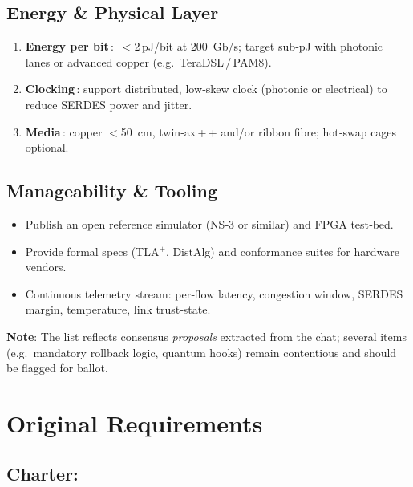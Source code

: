 \subsection{Energy \& Physical Layer}
\begin{enumerate}%
  \item \textbf{Energy per bit}\,: \,$<$2\,pJ/bit at 200 Gb/s; target sub‑pJ with photonic lanes or advanced copper (e.g.\ TeraDSL\,/\,PAM8).  
  \item \textbf{Clocking}\,: support distributed, low‑skew clock (photonic or electrical) to reduce SERDES power and jitter.  
  \item \textbf{Media}\,: copper $<$50 cm, twin‑ax\,+\,+ and/or ribbon fibre; hot‑swap cages optional.
\end{enumerate}

\subsection{Manageability \& Tooling}
\begin{itemize}
  \item Publish an open reference simulator (NS‑3 or similar) and FPGA test‑bed.  
  \item Provide formal specs (TLA$^{+}$, DistAlg) and conformance suites for hardware vendors.  
  \item Continuous telemetry stream: per‑flow latency, congestion window, SERDES margin, temperature, link trust‑state.
\end{itemize}

\bigskip
\noindent\textbf{Note}: The list reflects consensus \emph{proposals} extracted from the chat; several items (e.g.\ mandatory rollback logic, quantum hooks) remain contentious and should be flagged for ballot.




\section{Original Requirements}

%




\subsection{Charter:}


